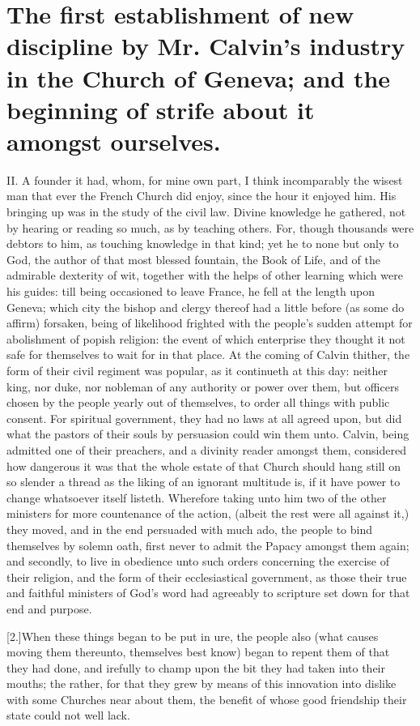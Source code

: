 \section*{The first establishment of new discipline by Mr. Calvin’s industry in the Church of Geneva; and the beginning of strife about it amongst ourselves.}

II. A founder it had, whom, for mine own part, I think incomparably the wisest man that ever the French Church did enjoy, since the hour it enjoyed him. His bringing up was in the study of the civil law. Divine knowledge he gathered, not by hearing or reading so much, as by teaching others. For, though thousands were debtors to him, as touching knowledge in that kind; yet he to none but only to God, the author of that most blessed fountain, the Book of Life, and of the admirable dexterity of wit, together with the helps of other learning which were his guides: till being occasioned to leave France, he fell at the length upon Geneva; which city the bishop and clergy thereof had a little before (as some do affirm) forsaken, being of likelihood frighted with the people’s sudden attempt for abolishment of popish religion: the event of which enterprise they thought it not safe for themselves to wait for in that place. At the coming of Calvin thither, the form of their civil regiment was popular, as it continueth at this day: neither king, nor duke, nor nobleman of any authority or power over them, but officers chosen by the people yearly out of themselves, to order all things with public consent. For spiritual government, they had no laws at all agreed upon, but did what the pastors of their souls by persuasion could win them unto. Calvin, being admitted one of their preachers, and a divinity reader amongst them, considered how dangerous it was that the whole estate of that Church should hang still on so slender a thread as the liking of an ignorant multitude is, if it have power to change whatsoever itself listeth. Wherefore taking unto him two of the other ministers for more countenance of the action, (albeit the rest were all against it,) they moved, and in the end persuaded with much ado, the people to bind themselves by solemn oath, first never to admit the Papacy amongst them again; and secondly, to live in obedience unto such orders concerning the exercise of their religion, and the form of their ecclesiastical government, as those their true and faithful ministers of God’s word had agreeably to scripture set down for that end and purpose.

[2.]When these things began to be put in ure, the people also (what causes moving them thereunto, themselves best know) began to repent them of that they had done, and irefully to champ upon the bit they had taken into their mouths; the rather, for that they grew by means of this innovation into dislike with some Churches near about them, the benefit of whose good friendship their state could not well lack.

